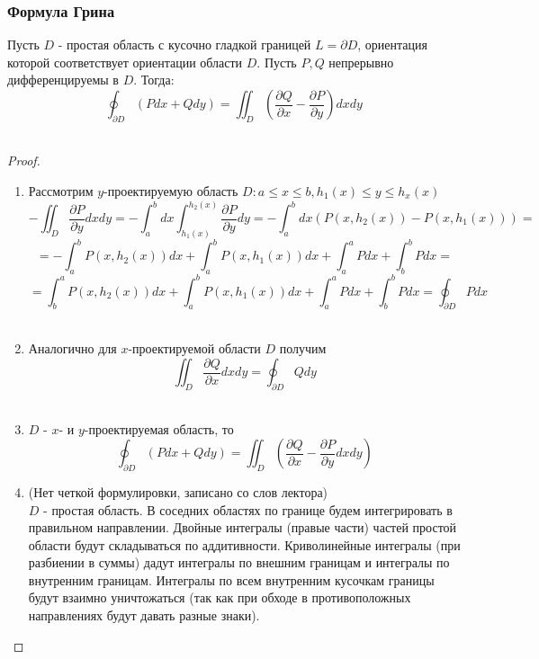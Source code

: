 \subsubsection{Формула Грина}
    \begin{theorem*}
        Пусть $D$ - простая область с кусочно гладкой границей $L = \partial D$, ориентация которой соответствует ориентации области $D$. Пусть $P, Q$ непрерывно дифференцируемы в $D$. Тогда:\\
        $$\oint_{\partial D} \left(P dx + Q dy\right) = \iint_D \left(\frac{\partial Q}{\partial x} - \frac{\partial P}{\partial y}\right)dx dy$$\\
    \end{theorem*}
    \begin{proof}
    \begin{enumerate}
        \item 
        Рассмотрим $y$-проектируемую область $D: a \leq x \leq b, h_1\left(x\right) \leq y \leq h_x\left(x\right)$\\
        $$-\iint_D \frac{\partial P}{\partial y} dxdy = 
        -\int_a^b dx \int_{h_1\left(x\right)}^{h_2\left(x\right)}\frac{\partial P}{\partial y}dy =
        -\int_a^b dx \left(P\left(x, h_2\left(x\right)\right) - P\left(x, h_1\left(x\right)\right)\right) = $$
        $$= -\int_a^bP\left(x, h_2\left(x\right)\right)dx + \int_a^b P\left(x, h_1\left(x\right)\right)dx + \int_a^a Pdx + \int_b^b Pdx = $$
        $$= \int_b^aP\left(x, h_2\left(x\right)\right)dx + \int_a^b P\left(x, h_1\left(x\right)\right)dx + \int_a^a Pdx + \int_b^b Pdx = 
        \oint_{\partial D} Pdx$$\\
        \item
        Аналогично для $x$-проектируемой области $D$ получим\\
        $$\iint_D\frac{\partial Q}{\partial x}dxdy = \oint_{\partial D} Q dy$$\\
        \item
        $D$ - $x$- и $y$-проектируемая область, то \\
        $$\oint_{\partial D}\left(Pdx + Qdy\right) = \iint_D \left(\frac{\partial Q}{\partial x} - \frac{\partial P}{\partial y}dxdy\right)$$
        \item (Нет четкой формулировки, записано со слов лектора)\\
        $D$ - простая область. В соседних областях по границе будем интегрировать в правильном направлении. Двойные интегралы (правые части) частей простой области будут складываться по аддитивности. Криволинейные интегралы (при разбиении в суммы) дадут интегралы по внешним границам и интегралы по внутренним границам. Интегралы по всем внутренним кусочкам границы будут взаимно уничтожаться (так как при обходе в противоположных направлениях будут давать разные знаки).
    \end{enumerate}
    
    \end{proof}
    
